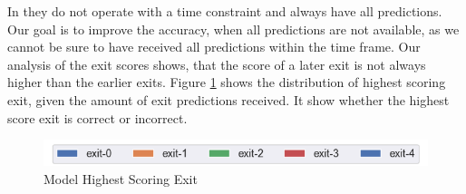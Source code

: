 In \cite{kaya_shallow-deep_nodate} they do not operate with a time constraint and always have all predictions. Our goal is to improve the accuracy, when all predictions are not available, as we cannot be sure to have received all predictions within the time frame. Our analysis of the exit scores shows, that the score of a later exit is not always higher than the earlier exits. Figure \ref{fig:exit-highscore} shows the distribution of highest scoring exit, given the amount of exit predictions received. It show whether the  highest score exit is correct or incorrect.

\begin{figure}
	\captionsetup[subfigure]{justification=centering}
	\centering
	\includegraphics[width=.7\linewidth]{figures/edge/exit0-4_legend}
	\hfill
	\hfill
	\caption[Model Highest Scoring Exit]{Model Highest Scoring Exit}
	\label{fig:exit-highscore}
\end{figure}

